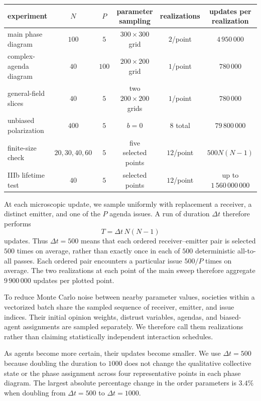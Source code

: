 \documentclass{article}
\begin{document}
\begin{table}[H]
\centering\scriptsize
\begin{tabular}{@{}lccccc@{}}
\toprule
experiment & $N$ & $P$ & parameter sampling & realizations & updates per realization \\
\midrule
main phase diagram & $100$ & $5$ & $300\times300$ grid & $2$/point & $4\,950\,000$ \\
complex-agenda diagram & $40$ & $100$ & $200\times200$ grid & $1$/point & $780\,000$ \\
general-field slices & $40$ & $5$ & two $200\times200$ grids & $1$/point & $780\,000$ \\
unbiased polarization & $400$ & $5$ & $b=0$ & $8$ total & $79\,800\,000$ \\
finite-size check & $20,30,40,60$ & $5$ & five selected points & $12$/point & $500N(N-1)$ \\
IIIb lifetime test & $40$ & $5$ & selected points & $12$/point & up to $1\,560\,000\,000$ \\
\bottomrule
\end{tabular}
\end{table}

At each microscopic update, we sample uniformly with replacement a receiver,
a distinct emitter, and one of the $P$ agenda issues. A run of duration
$\Delta t$ therefore performs
\begin{equation}
  T = \Delta t\,N(N-1)
  \label{eq:simulation-duration}
\end{equation}
updates. Thus $\Delta t=500$ means that each ordered receiver--emitter pair is
selected $500$ times on average, rather than exactly once in each of $500$
deterministic all-to-all passes. Each ordered pair encounters a particular issue
$500/P$ times on average. The two realizations at each point of the main sweep
therefore aggregate $9\,900\,000$ updates per plotted point.

To reduce Monte Carlo noise between nearby parameter values, societies within a
vectorized batch share the sampled sequence of receiver, emitter, and issue
indices. Their initial opinion weights, distrust variables, agendas, and biased-agent
assignments are sampled separately. We therefore call them realizations rather
than claiming statistically independent interaction schedules.

As agents become more certain, their updates become smaller. We use $\Delta t=500$ because doubling the duration to $1000$
does not change the qualitative collective state or the phase assignment across
four representative points in each phase diagram. The largest absolute percentage change in the order parameters is $3.4\%$ when doubling from $\Delta t=500$ to $\Delta t =1000$.
\end{document}
